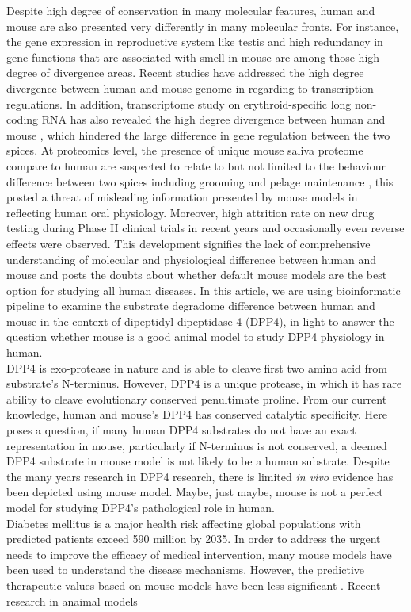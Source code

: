 Despite high degree of conservation in many molecular features, human and mouse are also presented very differently in many molecular fronts. For instance, the gene expression in reproductive system like testis \cite{Chan_2009, Brawand_2011, Necsulea_2014} and high redundancy in gene functions that are associated with smell in mouse \cite{Gilad_2009, Gilad_2003, Young_2002} are among those high degree of divergence areas. Recent studies have addressed the high degree divergence between human and mouse genome in regarding to transcription regulations. \cite{25409824} In addition, transcriptome study on erythroid-specific long non-coding RNA has also revealed the high degree divergence between human and mouse \cite{An_2015}, which hindered the large difference in gene regulation between the two spices. At proteomics level, the presence of unique mouse saliva proteome compare to human are suspected to relate to but not limited to the behaviour difference between two spices including grooming and pelage maintenance \cite{Karn_2013}, this posted a threat of misleading information presented by mouse models in reflecting human oral physiology. Moreover, high attrition rate on new drug testing during Phase II clinical trials in recent years \cite{Arrowsmith_2011} and occasionally even reverse effects were observed. This development signifies the lack of comprehensive understanding of molecular and physiological difference between human and mouse \cite{de_Magalh_es_2014} and posts the doubts about whether default mouse models are the best option for studying all human diseases. In this article, we are using bioinformatic pipeline to examine the substrate degradome difference between human and mouse in the context of dipeptidyl dipeptidase-4 (DPP4), in light to answer the question whether mouse is a good animal model to study DPP4 physiology in human.
\\

DPP4 is exo-protease in nature and is able to cleave first two amino acid from substrate's N-terminus. However, DPP4 is a unique protease, in which it has rare ability to cleave evolutionary conserved penultimate proline. From our current knowledge, human and mouse's DPP4 has conserved catalytic specificity. Here poses a question, if many human DPP4 substrates do not have an exact representation in mouse, particularly if N-terminus is not conserved, a deemed DPP4 substrate in mouse model is not likely to be a human substrate. Despite the many years research in DPP4 research, there is limited \textit{in vivo} evidence has been depicted using mouse model. Maybe, just maybe, mouse is not a perfect model for studying DPP4's pathological role in human. \\

Diabetes mellitus is a major health risk affecting global populations with predicted patients exceed 590 million by 2035. \cite{IDF_Diabetes_Atlas_Group_2015} In order to address the urgent needs to improve the efficacy of medical intervention, many mouse models have been used to understand the disease mechanisms. However, the predictive therapeutic values based on mouse models have been less significant \cite{Renner_2016, Hay_2014}. Recent research in anaimal models 

\cite{Justice_2011}